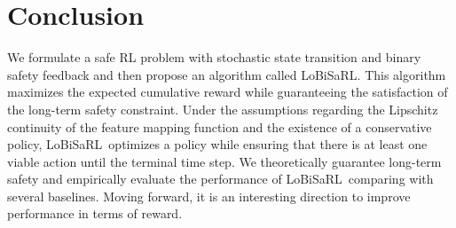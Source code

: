 \documentclass[letterpaper]{article} %
\newcommand{\algo}{\textsf{LoBiSaRL}}
\begin{document}
\section{Conclusion}

We formulate a safe RL problem with stochastic state transition and binary safety feedback and then propose an algorithm called \algo.
This algorithm maximizes the expected cumulative reward while guaranteeing the satisfaction of the long-term safety constraint.
Under the assumptions regarding the Lipschitz continuity of the feature mapping function and the existence of a conservative policy, \algo~optimizes a policy while ensuring that there is at least one viable action until the terminal time step.
We theoretically guarantee long-term safety and empirically evaluate the performance of \algo~comparing with several baselines.
Moving forward, it is an interesting direction to improve performance in terms of reward.
\end{document}
